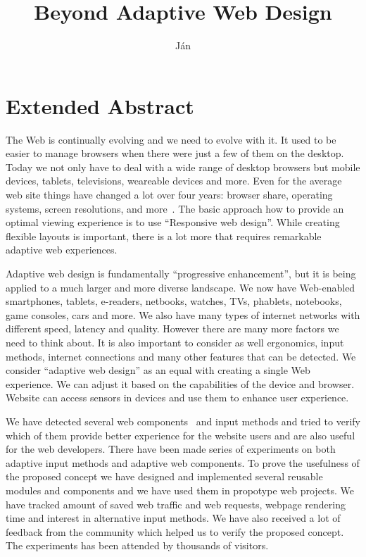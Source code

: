 \documentclass{iitsrc}
\title{Beyond Adaptive Web Design}
\author{Ján}{Antala}
\begin{document}
\section*{Extended Abstract}

The Web is continually evolving and we need to evolve with it. It used to be easier to manage browsers when there were just a few of them on the desktop. Today we not only have to deal with a wide range of desktop browsers but mobile devices, tablets, televisions, weareable devices and more. Even for the average web site things have changed a lot over four years: browser share, operating systems, screen resolutions, and more~\cite{ui17}. The basic approach how to provide an optimal viewing experience is to use ``Responsive web design''. While creating flexible layouts is important, there is a lot more that requires remarkable adaptive web experiences.

Adaptive web design is fundamentally ``progressive enhancement'', but it is being applied to a much larger and more diverse landscape. We now have Web-enabled smartphones, tablets, e-readers, netbooks, watches, TVs, phablets, notebooks, game consoles, cars and more. We also have many types of internet networks with different speed, latency and quality. However there are many more factors we need to think about. It is also important to consider as well ergonomics, input methods, internet connections and many other features that can be detected. We consider ``adaptive web design'' as an equal with creating a single Web experience. We can adjust it based on the capabilities of the device and browser. Website can access sensors in devices and use them to enhance user experience.


We have detected several web components~\cite{webcomponents} and input methods and tried to verify which of them provide better experience for the website users and are also useful for the web developers. There have been made series of experiments on both adaptive input methods and adaptive web components. To prove the usefulness of the proposed concept we have designed and implemented several reusable modules and components and we have used them in propotype web projects. We have tracked amount of saved web traffic and web requests, webpage rendering time and interest in alternative input methods. We have also received a lot of feedback from the community which helped us to verify the proposed concept. The experiments has been attended by thousands of visitors.
\end{document}
